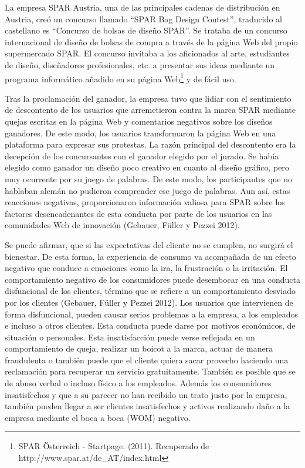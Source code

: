 La empresa SPAR Austria, una de las principales cadenas de distribución en Austria, creó un concurso llamado “SPAR Bag Design Contest”, traducido al castellano es “Concurso de bolsas de diseño SPAR”. Se trataba de un concurso internacional de diseño de bolsas de compra a través de la página Web del propio supermercado SPAR. El concurso invitaba a los aficionados al arte, estudiantes de diseño, diseñadores profesionales, etc. a presentar sus ideas mediante un programa informático añadido en su página Web\footnote{SPAR Österreich - Startpage. (2011). Recuperado de http://www.spar.at/de\_AT/index.html} y de fácil uso.

Tras la proclamación del ganador, la empresa tuvo que lidiar con el sentimiento de descontento de los usuarios que arremetieron contra la marca SPAR mediante quejas escritas en la página Web y comentarios negativos sobre los diseños ganadores. De este modo, los usuarios transformaron la página Web en una plataforma para expresar sus protestas. La razón principal del descontento era la decepción de los concursantes con el ganador elegido por el jurado. Se había elegido como ganador un diseño poco creativo en cuanto al diseño gráfico, pero muy ocurrente por su juego de palabras. De este modo, los participantes que no hablaban alemán no pudieron comprender ese juego de palabras. Aun así, estas reacciones negativas, proporcionaron información valiosa para SPAR sobre los factores desencadenantes de esta conducta por parte de los usuarios en las comunidades Web de innovación (Gebauer, Füller y Pezzei 2012).

Se puede afirmar, que si las expectativas del cliente no se cumplen, no surgirá el bienestar. De esta forma, la experiencia de consumo va acompañada de un efecto negativo que conduce a emociones como la ira, la frustración o la irritación. El comportamiento negativo de los consumidores puede desembocar en una conducta disfuncional de los clientes, término que se refiere a un comportamiento desviado por los clientes (Gebauer, Füller y Pezzei 2012). Los usuarios que intervienen de forma disfuncional, pueden causar serios problemas a la empresa, a los empleados e incluso a otros clientes. Esta conducta puede darse por motivos económicos, de situación o personales. Esta insatisfacción puede verse reflejada en un comportamiento de queja, realizar un boicot a la marca, actuar de manera fraudulenta o también puede que el cliente quiera sacar provecho haciendo una reclamación para recuperar un servicio gratuitamente. También es posible que se de abuso verbal o incluso físico a los empleados. Además los consumidores insatisfechos y que a su parecer no han recibido un trato justo por la empresa, también pueden llegar a ser clientes insatisfechos y activos realizando daño a la empresa mediante el boca a boca (WOM) negativo.


